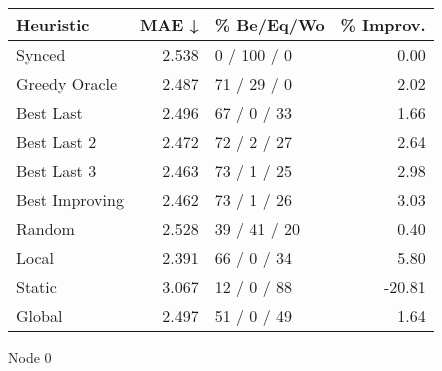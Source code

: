 \begin{tabular}{lrlr}
\toprule
\textbf{Heuristic} & \textbf{MAE ↓} & \textbf{\% Be/Eq/Wo} & \textbf{\% Improv.} \\
\midrule
            Synced &          2.538 &          0 / 100 / 0 &                0.00 \\
     Greedy Oracle &          2.487 &          71 / 29 / 0 &                2.02 \\
         Best Last &          2.496 &          67 / 0 / 33 &                1.66 \\
       Best Last 2 &          2.472 &          72 / 2 / 27 &                2.64 \\
       Best Last 3 &          2.463 &          73 / 1 / 25 &                2.98 \\
    Best Improving &          2.462 &          73 / 1 / 26 &                3.03 \\
            Random &          2.528 &         39 / 41 / 20 &                0.40 \\
             Local &          2.391 &          66 / 0 / 34 &                5.80 \\
            Static &          3.067 &          12 / 0 / 88 &              -20.81 \\
            Global &          2.497 &          51 / 0 / 49 &                1.64 \\
\bottomrule
\end{tabular}
\caption{Node 0}
\label{tab:ds_non_lr01_le1_bs2_0}
